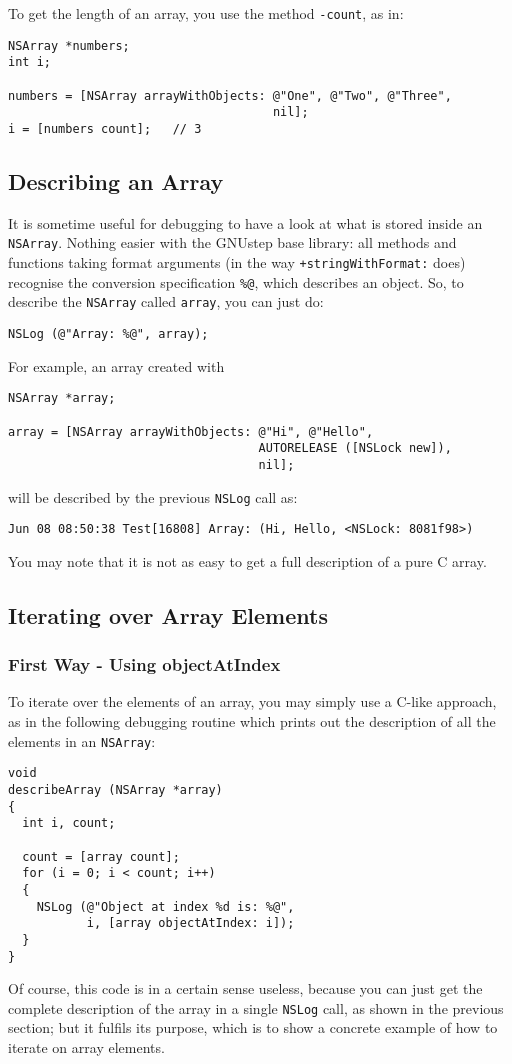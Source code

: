 \documentclass[a4paper]{article}
\begin{document}
To get the length of an array, you use the method \texttt{-count}, 
as in: 
\begin{verbatim}
NSArray *numbers;
int i;

numbers = [NSArray arrayWithObjects: @"One", @"Two", @"Three", 
                                     nil];
i = [numbers count];   // 3
\end{verbatim}

\subsection{Describing an Array}
It is sometime useful for debugging to have a look at what is stored
inside an \texttt{NSArray}.  Nothing easier with the GNUstep base
library: all methods and functions taking format arguments (in the way
\texttt{+stringWithFormat:} does) recognise the conversion specification
\texttt{\%@}, which describes an object.  So, to describe the 
\texttt{NSArray} called \texttt{array}, you can just do:
\begin{verbatim}
NSLog (@"Array: %@", array);
\end{verbatim}

For example, an array created with 
\begin{verbatim}
NSArray *array;

array = [NSArray arrayWithObjects: @"Hi", @"Hello", 
                                   AUTORELEASE ([NSLock new]), 
                                   nil];
\end{verbatim}
will be described by the previous \texttt{NSLog} call as: 
\begin{verbatim}
Jun 08 08:50:38 Test[16808] Array: (Hi, Hello, <NSLock: 8081f98>)
\end{verbatim}

You may note that it is not as easy to get a full description of a
pure C array.

\subsection{Iterating over Array Elements}
\subsubsection{First Way - Using objectAtIndex}
To iterate over the elements of an array, you may simply use a C-like
approach, as in the following debugging routine which prints out the
description of all the elements in an \texttt{NSArray}:
\begin{verbatim}
void
describeArray (NSArray *array)
{
  int i, count;

  count = [array count];
  for (i = 0; i < count; i++)
  {
    NSLog (@"Object at index %d is: %@", 
           i, [array objectAtIndex: i]);
  }
}
\end{verbatim}
Of course, this code is in a certain sense useless, because you can
just get the complete description of the array in a single
\texttt{NSLog} call, as shown in the previous section; but it fulfils
its purpose, which is to show a concrete example of how to iterate on
array elements.
\end{document}
